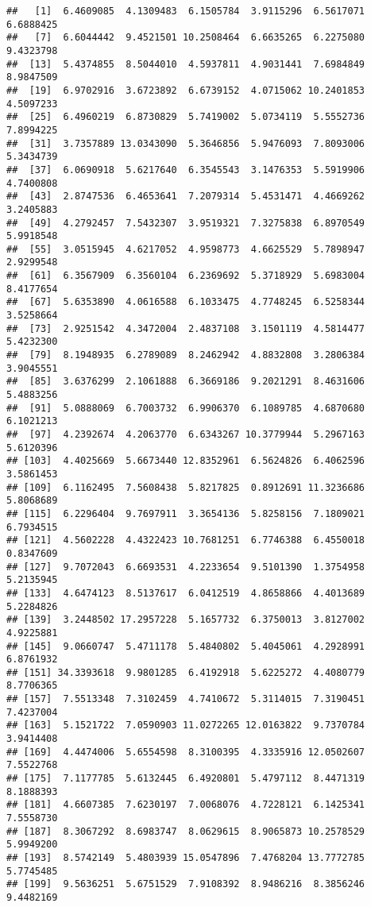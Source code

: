 \documentclass[
]{article}
\begin{document}
\begin{verbatim}
##   [1]  6.4609085  4.1309483  6.1505784  3.9115296  6.5617071  6.6888425
##   [7]  6.6044442  9.4521501 10.2508464  6.6635265  6.2275080  9.4323798
##  [13]  5.4374855  8.5044010  4.5937811  4.9031441  7.6984849  8.9847509
##  [19]  6.9702916  3.6723892  6.6739152  4.0715062 10.2401853  4.5097233
##  [25]  6.4960219  6.8730829  5.7419002  5.0734119  5.5552736  7.8994225
##  [31]  3.7357889 13.0343090  5.3646856  5.9476093  7.8093006  5.3434739
##  [37]  6.0690918  5.6217640  6.3545543  3.1476353  5.5919906  4.7400808
##  [43]  2.8747536  6.4653641  7.2079314  5.4531471  4.4669262  3.2405883
##  [49]  4.2792457  7.5432307  3.9519321  7.3275838  6.8970549  5.9918548
##  [55]  3.0515945  4.6217052  4.9598773  4.6625529  5.7898947  2.9299548
##  [61]  6.3567909  6.3560104  6.2369692  5.3718929  5.6983004  8.4177654
##  [67]  5.6353890  4.0616588  6.1033475  4.7748245  6.5258344  3.5258664
##  [73]  2.9251542  4.3472004  2.4837108  3.1501119  4.5814477  5.4232300
##  [79]  8.1948935  6.2789089  8.2462942  4.8832808  3.2806384  3.9045551
##  [85]  3.6376299  2.1061888  6.3669186  9.2021291  8.4631606  5.4883256
##  [91]  5.0888069  6.7003732  6.9906370  6.1089785  4.6870680  6.1021213
##  [97]  4.2392674  4.2063770  6.6343267 10.3779944  5.2967163  5.6120396
## [103]  4.4025669  5.6673440 12.8352961  6.5624826  6.4062596  3.5861453
## [109]  6.1162495  7.5608438  5.8217825  0.8912691 11.3236686  5.8068689
## [115]  6.2296404  9.7697911  3.3654136  5.8258156  7.1809021  6.7934515
## [121]  4.5602228  4.4322423 10.7681251  6.7746388  6.4550018  0.8347609
## [127]  9.7072043  6.6693531  4.2233654  9.5101390  1.3754958  5.2135945
## [133]  4.6474123  8.5137617  6.0412519  4.8658866  4.4013689  5.2284826
## [139]  3.2448502 17.2957228  5.1657732  6.3750013  3.8127002  4.9225881
## [145]  9.0660747  5.4711178  5.4840802  5.4045061  4.2928991  6.8761932
## [151] 34.3393618  9.9801285  6.4192918  5.6225272  4.4080779  8.7706365
## [157]  7.5513348  7.3102459  4.7410672  5.3114015  7.3190451  7.4237004
## [163]  5.1521722  7.0590903 11.0272265 12.0163822  9.7370784  3.9414408
## [169]  4.4474006  5.6554598  8.3100395  4.3335916 12.0502607  7.5522768
## [175]  7.1177785  5.6132445  6.4920801  5.4797112  8.4471319  8.1888393
## [181]  4.6607385  7.6230197  7.0068076  4.7228121  6.1425341  7.5558730
## [187]  8.3067292  8.6983747  8.0629615  8.9065873 10.2578529  5.9949200
## [193]  8.5742149  5.4803939 15.0547896  7.4768204 13.7772785  5.7745485
## [199]  9.5636251  5.6751529  7.9108392  8.9486216  8.3856246  9.4482169

\end{verbatim}
\end{document}
